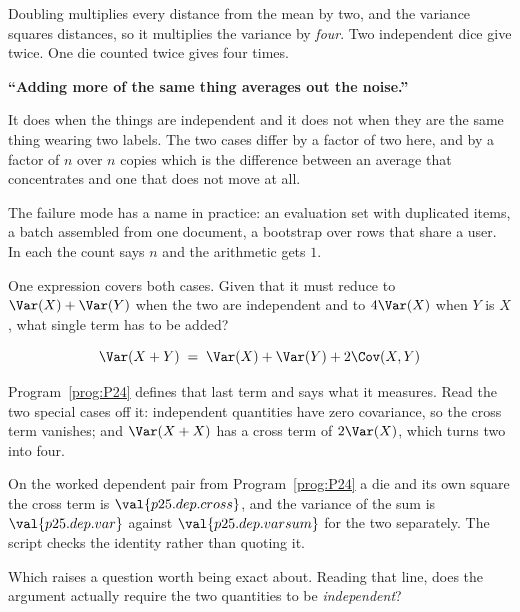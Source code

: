 \begin{fr}

Doubling multiplies every distance from the mean by two, and the variance
squares distances, so it multiplies the variance by \emph{four}. Two
independent dice give twice. One die counted twice gives four times.

\begin{trapbox}
\textbf{\enquote{Adding more of the same thing averages out the noise.}}

It does when the things are independent and it does not when they are the same
thing wearing two labels. The two cases differ by a factor of two here, and by
a factor of $n$ over $n$ copies \dash{} which is the difference between an
average that concentrates and one that does not move at all.

The failure mode has a name in practice: an evaluation set with duplicated
items, a batch assembled from one document, a bootstrap over rows that share a
user. In each the count says $n$ and the arithmetic gets $1$.
\end{trapbox}

One expression covers both cases. Given that it must reduce to
$\Var(X) + \Var(Y)$ when the two are independent and to $4\Var(X)$ when
$Y$ is $X$, what single term has to be added?
\dotline
\nextframe
\end{fr}

\begin{fr}

\[ \Var(X + Y) \;=\; \Var(X) + \Var(Y) + 2\Cov(X, Y) \]

Program~\ref{prog:P24} defines that last term and says what it measures. Read
the two special cases off it: independent quantities have zero covariance, so
the cross term vanishes; and $\Var(X + X)$ has a cross term of $2\Var(X)$,
which turns two into four.

On the worked dependent pair from Program~\ref{prog:P24} \dash{} a die and its
own square \dash{} the cross term is $\val{p25.dep.cross}$, and the variance
of the sum is $\val{p25.dep.var}$ against $\val{p25.dep.varsum}$ for the two
separately. The script checks the identity rather than quoting it.

Which raises a question worth being exact about. Reading that line, does the
argument actually require the two quantities to be \emph{independent}?
\dotline
\nextframe
\end{fr}

